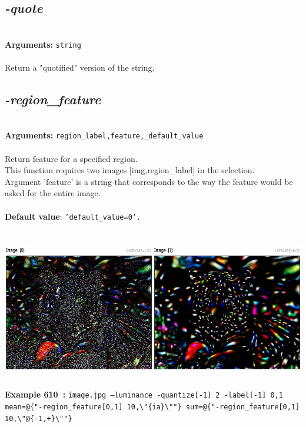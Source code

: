 \documentclass[a4paper,11pt,twoside]{book}
\begin{document}
\subsection{\emph{-quote} }\vspace*{-0.5em}
~\\\textbf{Arguments: } 
{\small \texttt{string}}\\~\\
Return a "quotified" version of the string.


\subsection{\emph{-region\_feature} }\vspace*{-0.5em}
~\\\textbf{Arguments: } 
{\small \texttt{region\_label,feature,\_default\_value}}\\~\\
Return feature for a specified region.
~\\This function requires two images [img,region\_label] in the selection.
~\\Argument 'feature' is a string that corresponds to the way the feature would
be asked for the entire image.
~\\~\\\textbf{Default value}: {\small \texttt{'default\_value=0'.}}
\begin{center}\includegraphics[keepaspectratio=true,height=7cm,width=\textwidth]{img/gmic_def610.jpg}\\
{\footnotesize \textbf{Example 610~:} \texttt{image.jpg --luminance -quantize[-1] 2 -label[-1] 0,1 mean=@\{"-region\_feature[0,1] 10,\textbackslash "\{ia\}\textbackslash ""\} sum=@\{"-region\_feature[0,1] 10,\textbackslash "@\{-1,+\}\textbackslash ""\}}}
\end{center}
\end{document}
